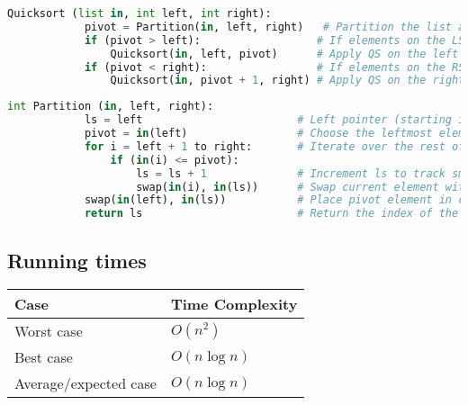 \documentclass{article}
\begin{document}
\begin{algo}
    \begin{lstlisting}[language=Python]
        Quicksort (list in, int left, int right):
            pivot = Partition(in, left, right)   # Partition the list and return the pivot 
            if (pivot > left):                  # If elements on the LS of pivot
                Quicksort(in, left, pivot)      # Apply QS on the left partition
            if (pivot < right):                 # If elements on the RS of pivot
                Quicksort(in, pivot + 1, right) # Apply QS on the right partition
    \end{lstlisting}
    \vspace{1em}

    \begin{lstlisting}[language=Python]
        int Partition (in, left, right):
            ls = left                        # Left pointer (starting index)
            pivot = in(left)                 # Choose the leftmost element as the pivot
            for i = left + 1 to right:       # Iterate over the rest of the elements
                if (in(i) <= pivot):         
                    ls = ls + 1              # Increment ls to track smaller elements
                    swap(in(i), in(ls))      # Swap current element with the element at ls
            swap(in(left), in(ls))           # Place pivot element in correct position
            return ls                        # Return the index of the pivot
    \end{lstlisting}
\end{algo}

\subsection{Running times}
\begin{summary}
    \begin{center}
        \begin{tabular}{p{8cm} p{8cm}}
            \hline
            \textbf{Case} & \textbf{Time Complexity} \\ \hline
            Worst case               & $O(n^2)$              \\ \hline
            Best case                & $O(n \log n)$                \\ \hline
            Average/expected case & $O(n \log n)$ \\ \hline
        \end{tabular}    
    \end{center}
\end{summary}
\end{document}
